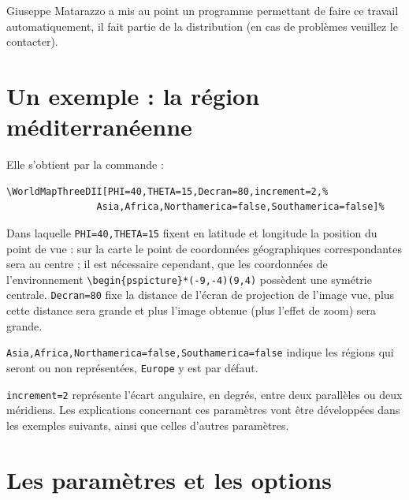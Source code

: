 \documentclass[11pt,french,BCOR10mm,DIV12,bibliography=totoc,parskip=false,
   smallheadings, headexclude,footexclude,oneside]{pst-doc}
\begin{document}
Giuseppe Matarazzo a mis au point un programme permettant de faire
ce travail automatiquement, il fait partie de la distribution (en cas de problèmes veuillez le contacter).

\section{Un exemple : la région méditerranéenne}
Elle s'obtient par la commande :
\begin{verbatim}
\WorldMapThreeDII[PHI=40,THETA=15,Decran=80,increment=2,%
                Asia,Africa,Northamerica=false,Southamerica=false]%
\end{verbatim}

Dans laquelle \texttt{PHI=40,THETA=15} fixent en latitude et longitude la
position du point de vue : sur la carte le point de coordonnées
géographiques correspondantes sera au centre ; il est nécessaire cependant, que les coordonnées de
l'environnement \verb+\begin{pspicture}*(-9,-4)(9,4)+ possèdent une symétrie
centrale. \texttt{Decran=80} fixe la distance de l'écran de projection de
l'image vue, plus cette distance sera grande et plus l'image obtenue (plus
l'effet de zoom) sera grande.

\texttt{Asia,Africa,Northamerica=false,Southamerica=false} indique les régions
qui seront ou non représentées, \texttt{Europe} y est par défaut.

\texttt{increment=2} représente l'écart angulaire, en degrés, entre deux
parallèles ou deux méridiens. Les explications concernant ces paramètres
vont être développées dans les exemples suivants, ainsi que celles d'autres
paramètres.


\section{Les paramètres et les options}
\end{document}
